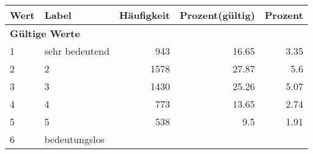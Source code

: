      \begin{longtable}{lXrrr}
     \toprule
     \textbf{Wert} & \textbf{Label} & \textbf{Häufigkeit} & \textbf{Prozent(gültig)} & \textbf{Prozent} \\
     \endhead
     \midrule
     \multicolumn{5}{l}{\textbf{Gültige Werte}}\\

     1 &
     \multicolumn{1}{X}{ sehr bedeutend   } &


       \num{943} &
       \num[round-mode=places,round-precision=2]{16.65} &
         \num[round-mode=places,round-precision=2]{3.35} \\

     2 &
     \multicolumn{1}{X}{ 2   } &


       \num{1578} &
       \num[round-mode=places,round-precision=2]{27.87} &
         \num[round-mode=places,round-precision=2]{5.6} \\

     3 &
     \multicolumn{1}{X}{ 3   } &


       \num{1430} &
       \num[round-mode=places,round-precision=2]{25.26} &
         \num[round-mode=places,round-precision=2]{5.07} \\

     4 &
     \multicolumn{1}{X}{ 4   } &


       \num{773} &
       \num[round-mode=places,round-precision=2]{13.65} &
         \num[round-mode=places,round-precision=2]{2.74} \\

     5 &
     \multicolumn{1}{X}{ 5   } &


       \num{538} &
       \num[round-mode=places,round-precision=2]{9.5} &
         \num[round-mode=places,round-precision=2]{1.91} \\

     6 &
     \multicolumn{1}{X}{ bedeutungslos   } &



\end{longtable}
